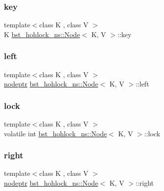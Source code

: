 \subsubsection{\texorpdfstring{key}{key}}
{\footnotesize\ttfamily template$<$class K , class V $>$ \\
K \hyperlink{classbst__hohlock__ns_1_1Node}{bst\+\_\+hohlock\+\_\+ns\+::\+Node}$<$ K, V $>$\+::key}

\mbox{\label{classbst__hohlock__ns_1_1Node_a72ae7c6e54b707177be29b8e96edd009}} 
\subsubsection{\texorpdfstring{left}{left}}
{\footnotesize\ttfamily template$<$class K , class V $>$ \\
\hyperlink{bst__rwlock__impl_8h_a04158d2a20768fe447133ff555823b05}{nodeptr} \hyperlink{classbst__hohlock__ns_1_1Node}{bst\+\_\+hohlock\+\_\+ns\+::\+Node}$<$ K, V $>$\+::left}

\mbox{\label{classbst__hohlock__ns_1_1Node_abf98ca8e1b6e49ca39adc419a270b265}} 
\subsubsection{\texorpdfstring{lock}{lock}}
{\footnotesize\ttfamily template$<$class K , class V $>$ \\
volatile int \hyperlink{classbst__hohlock__ns_1_1Node}{bst\+\_\+hohlock\+\_\+ns\+::\+Node}$<$ K, V $>$\+::lock}

\mbox{\label{classbst__hohlock__ns_1_1Node_a51d55faa8bc2cdb0bd27a5e86658b5bb}} 
\subsubsection{\texorpdfstring{right}{right}}
{\footnotesize\ttfamily template$<$class K , class V $>$ \\
\hyperlink{bst__rwlock__impl_8h_a04158d2a20768fe447133ff555823b05}{nodeptr} \hyperlink{classbst__hohlock__ns_1_1Node}{bst\+\_\+hohlock\+\_\+ns\+::\+Node}$<$ K, V $>$\+::right}

